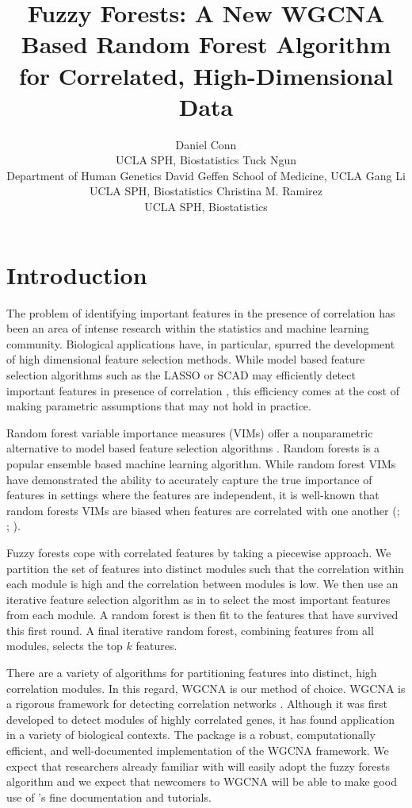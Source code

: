 \documentclass[article,shortnames]{jss}
\author{Daniel Conn\\ UCLA SPH, Biostatistics \AND Tuck Ngun\\Department of Human Genetics David Geffen School of Medicine, UCLA \AND  Gang Li\\UCLA SPH, Biostatistics \And Christina M. Ramirez\\UCLA SPH, Biostatistics}
\title{Fuzzy Forests: A New WGCNA Based Random Forest Algorithm for Correlated, High-Dimensional Data}
\begin{document}

\section{Introduction}
The problem of identifying important features in the presence of correlation has been an area of intense research within the statistics
and machine learning community.  Biological applications have, in particular, spurred the development of high dimensional feature selection methods.   
While model based feature selection algorithms such as the LASSO or SCAD may efficiently detect important features in presence of correlation \citep{raskutti2010restricted}, this efficiency comes at the cost of making parametric assumptions that may not hold in practice. 
 
Random forest variable importance measures (VIMs) offer a nonparametric alternative to model based feature selection algorithms \citep{breiman2001random}.
Random forests is a popular ensemble based machine learning algorithm.  While random forest VIMs have demonstrated the ability to accurately capture the true 
importance of features in settings where the features are independent, it is well-known that random forests VIMs are biased when features are correlated
with one another (\citep{strobl2007bias}; \citep{strobl2008conditional}; \citep{nicodemus2009predictor}).

Fuzzy forests cope with correlated features by taking a piecewise approach.  We partition the set of features into distinct modules such that the correlation within each module is high and the correlation between modules is low.  We then use an iterative feature selection algorithm as in \citep{diaz2006gene} to select the most important
features from each module.  A random forest is then fit to the features that have survived this first round.  A final iterative random forest,  combining features from all
modules, selects the top $k$ features. 

There are a variety of algorithms for partitioning features into distinct, high correlation modules.  In this regard, WGCNA is our method of choice.  WGCNA is a rigorous framework for detecting correlation networks \citep{zhang2005general}.  Although it was first developed to detect modules of highly correlated genes, it has found application in a variety of biological contexts.  The  package  is a robust, computationally efficient, and well-documented implementation of the WGCNA framework.  We expect that researchers already familiar with  will easily adopt the fuzzy forests algorithm and we expect that newcomers to WGCNA will be able to make good use of 's fine documentation and tutorials.
              
\end{document}
